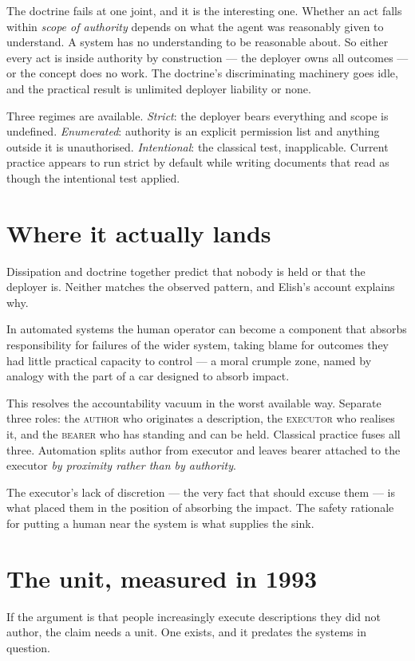 \documentclass[11pt,a4paper]{article}
\begin{document}
The doctrine fails at one joint, and it is the interesting one. Whether an act falls within \emph{scope of authority} depends on what the agent was reasonably given to understand. A system has no understanding to be reasonable about. So either every act is inside authority by construction --- the deployer owns all outcomes --- or the concept does no work. The doctrine's discriminating machinery goes idle, and the practical result is unlimited deployer liability or none.

Three regimes are available. \emph{Strict}: the deployer bears everything and scope is undefined. \emph{Enumerated}: authority is an explicit permission list and anything outside it is unauthorised. \emph{Intentional}: the classical test, inapplicable. Current practice appears to run strict by default while writing documents that read as though the intentional test applied.

\section{Where it actually lands}
Dissipation and doctrine together predict that nobody is held or that the deployer is. Neither matches the observed pattern, and Elish's account explains why.

In automated systems the human operator can become a component that absorbs responsibility for failures of the wider system, taking blame for outcomes they had little practical capacity to control --- a moral crumple zone, named by analogy with the part of a car designed to absorb impact.

This resolves the accountability vacuum in the worst available way. Separate three roles: the \textsc{author} who originates a description, the \textsc{executor} who realises it, and the \textsc{bearer} who has standing and can be held. Classical practice fuses all three. Automation splits author from executor and leaves bearer attached to the executor \emph{by proximity rather than by authority}.

The executor's lack of discretion --- the very fact that should excuse them --- is what placed them in the position of absorbing the impact. The safety rationale for putting a human near the system is what supplies the sink.

\section{The unit, measured in 1993}
If the argument is that people increasingly execute descriptions they did not author, the claim needs a unit. One exists, and it predates the systems in question.
\end{document}
